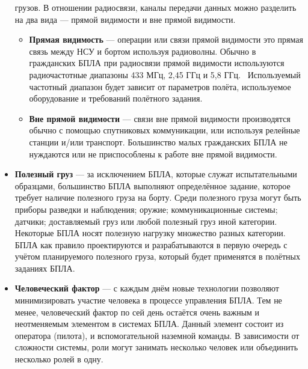 \documentclass[specification,annotation]{itmo-student-thesis}
\begin{document}
\begin{itemize}
    грузов. В отношении радиосвязи, каналы передачи данных можно разделить на
    два вида --- прямой видимости и вне прямой видимости.
    \begin{itemize}
      \item \textbf{Прямая видимость} --- операции или связи прямой видимости
        это прямая связь между НСУ и бортом используя радиоволны. Обычно в
        гражданских БПЛА при радиосвязи прямой видимости используются
        радиочастотные диапазоны 433 МГц, 2,45 ГГц и 5,8
        ГГц.~\cite{avaks-comm-systems} Используемый частотный диапазон будет
        зависит от параметров полёта, используемое оборудование и требований
        полётного задания.
      \item \textbf{Вне прямой видимости} --- связи вне прямой видимости
        производятся обычно с помощью спутниковых коммуникации, или используя
        релейные станции и/или транспорт. Большинство малых гражданских БПЛА не
        нуждаются или не приспособлены к работе вне прямой видимости.
    \end{itemize}
  \item \textbf{Полезный груз} --- за исключением БПЛА, которые служат
    испытательными образцами, большинство БПЛА выполняют определённое задание,
    которое требует наличие полезного груза на борту. Среди  полезного груза
    могут быть приборы разведки и наблюдения; оружие; коммуникационные системы;
    датчики; доставляемый груз или любой полезный груз иной категории. Некоторые
    БПЛА носят полезную нагрузку множество разных категории. БПЛА как правило
    проектируются и разрабатываются в первую очередь с учётом планируемого
    полезного груза, который будет применятся в полётных заданиях БПЛА.
  \item \textbf{Человеческий фактор} --- с каждым днём новые технологии
    позволяют минимизировать участие человека в процессе управления БПЛА. Тем не
    менее, человеческий фактор по сей день остаётся очень важным и неотменяемым
    элементом в системах БПЛА. Данный элемент состоит из оператора (пилота), и
    вспомогательной наземной команды. В зависимости от сложности системы, роли
    могут занимать несколько человек или объединить несколько ролей в одну.
\end{itemize}
\end{document}
